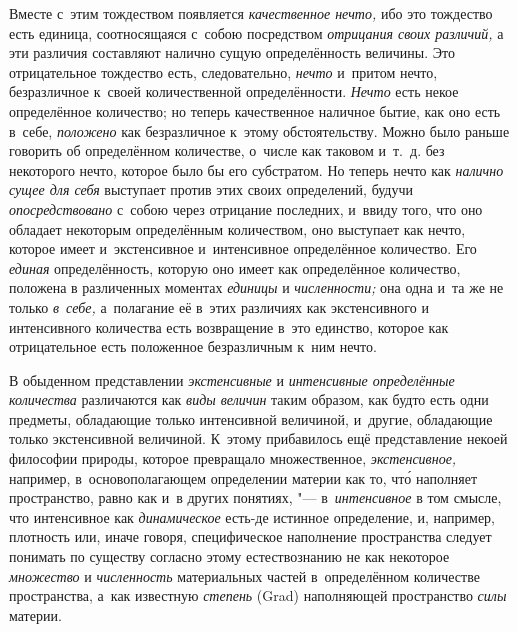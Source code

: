 Вместе с~этим тождеством появляется {\em качественное нечто,} ибо это тождество
есть единица, соотносящаяся с~собою посредством {\em отрицания своих различий,}
а эти различия составляют налично сущую определённость величины. Это
отрицательное тождество есть, следовательно, {\em нечто} и~притом нечто,
безразличное к~своей количественной определённости. {\em Нечто} есть некое
определённое количество; но теперь качественное наличное бытие, как оно есть
в~себе, {\em положено} как безразличное к~этому обстоятельству. Можно было
раньше говорить об определённом количестве, о~числе как таковом и~т.~д. без
некоторого нечто, которое было бы его субстратом. Но теперь нечто как
{\em налично сущее для себя} выступает против этих своих определений, будучи
{\em опосредствовано} с~собою через отрицание последних, и~ввиду того, что оно
обладает некоторым определённым количеством, оно выступает как нечто, которое
имеет и~экстенсивное и~интенсивное определённое количество. Его {\em единая}
определённость, которую оно имеет как определённое количество, положена в
различенных моментах {\em единицы} и {\em численности;} она одна и~та же не
только {\em в~себе,} а~полагание её в~этих различиях как экстенсивного и
интенсивного количества есть возвращение в~это единство, которое как
отрицательное есть положенное безразличным к~ним нечто.


В обыденном представлении {\em экстенсивные} и {\em интенсивные определённые
количества} различаются как {\em виды величин} таким образом, как будто есть
одни предметы, обладающие только интенсивной величиной, и~другие, обладающие
только экстенсивной величиной. К~этому прибавилось ещё представление
некоей философии природы, которое превращало множественное,
{\em экстенсивное,} например, в~основополагающем определении материи как то, чт\'{о} наполняет
пространство, равно как и~в других понятиях, "--- в~{\em интенсивное} в
том смысле, что интенсивное как {\em динамическое} есть-де истинное определение,
и, например, плотность или, иначе говоря, специфическое наполнение пространства
следует понимать по существу согласно этому естествознанию не как некоторое
{\em множество} и {\em численность} материальных частей в~определённом
количестве пространства, а~как известную {\em степень} (Grad) наполняющей
пространство {\em силы} материи.

